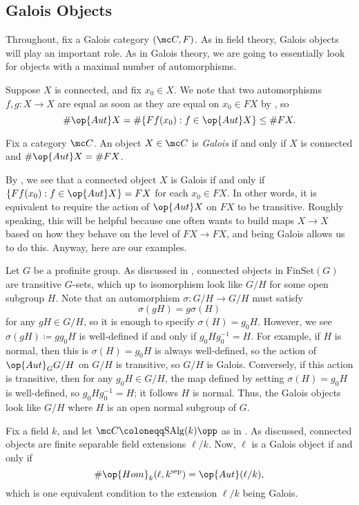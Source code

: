 \documentclass{amsart}
\begin{document}
\subsection{Galois Objects}
Throughout, fix a Galois category $(\mc C,F)$. As in field theory, Galois objects will play an important role. As in Galois theory, we are going to essentially look for objects with a maximal number of automorphisms.
\begin{remark} \label{rem:motivate-galois}
    Suppose $X$ is connected, and fix $x_0\in X$. We note that two automorphisms $f,g\colon X\to X$ are equal as soon as they are equal on $x_0\in FX$ by , so
    \[\#\op{Aut}X=\#\{Ff(x_0):f\in\op{Aut}X\}\le\#FX.\]
\end{remark}
\begin{definition}[Galois]
    Fix a category $\mc C$. An object $X\in\mc C$ is \textit{Galois} if and only if $X$ is connected and $\#\op{Aut}X=\#FX$.
\end{definition}
By , we see that a connected object $X$ is Galois if and only if $\{Ff(x_0):f\in\op{Aut}X\}=FX$ for each $x_0\in FX$. In other words, it is equivalent to require the action of $\op{Aut}X$ on $FX$ to be transitive. Roughly speaking, this will be helpful because one often wants to build maps $X\to X$ based on how they behave on the level of $FX\to FX$, and being Galois allows us to do this. Anyway, here are our examples.
\begin{example} \label{ex:g-set-galois}
    Let $G$ be a profinite group. As discussed in , connected objects in $\mathrm{FinSet}(G)$ are transitive $G$-sets, which up to isomorphism look like $G/H$ for some open subgroup $H$. Note that an automorphism $\sigma\colon G/H\to G/H$ must satisfy
    \[\sigma(gH)=g\sigma(H)\]
    for any $gH\in G/H$, so it is enough to specify $\sigma(H)=g_0H$. However, we see $\sigma(gH)\coloneqq gg_0H$ is well-defined if and only if $g_0Hg_0^{-1}=H$. For example, if $H$ is normal, then this is $\sigma(H)=g_0H$ is always well-defined, so the action of $\op{Aut}_GG/H$ on $G/H$ is transitive, so $G/H$ is Galois. Conversely, if this action is transitive, then for any $g_0H\in G/H$, the map defined by setting $\sigma(H)=g_0H$ is well-defined, so $g_0Hg_0^{-1}=H$; it follows $H$ is normal. Thus, the Galois objects look like $G/H$ where $H$ is an open normal subgroup of $G$.
\end{example}
\begin{example} \label{ex:galois-field}
    Fix a field $k$, and let $\mc C\coloneqq\mathrm{SAlg}(k)\opp$ as in . As discussed, connected objects are finite separable field extensions $\ell/k$. Now, $\ell$ is a Galois object if and only if
    \[\#\op{Hom}_k(\ell,k^{\mathrm{sep}})=\op{Aut}(\ell/k),\]
    which is one equivalent condition to the extension $\ell/k$ being Galois.
\end{example}
\end{document}
